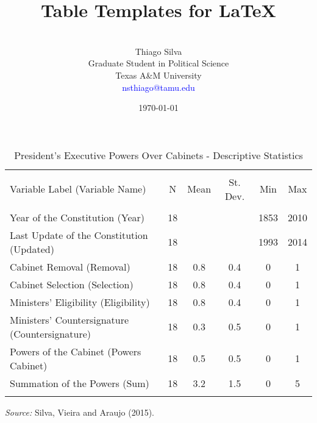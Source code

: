 \documentclass[12pt,a4paper]{article}
\title{	
\Large{Table Templates for \LaTeX} \\   %
}
\author{\\ Thiago Silva \\ \large  Graduate Student in Political Science \\ \large Texas A\&M University \\ \large \textcolor{blue}{nsthiago@tamu.edu}}%
\date{\today} %
\begin{document}
\maketitle %


\begin{table}[htbp] \centering 
  \caption{President's Executive Powers Over Cabinets - Descriptive Statistics  \label{PrePower} } 
\begin{tabular}{@{\extracolsep{5pt}}lccccc} 
\\[-1.8ex]\hline 
\hline \\[-1.8ex] 
Variable Label (Variable Name) & \multicolumn{1}{c}{N} & \multicolumn{1}{c}{Mean} & \multicolumn{1}{c}{St. Dev.} & \multicolumn{1}{c}{Min} & \multicolumn{1}{c}{Max} \\ 
\hline \\[-1.8ex] 
Year of the Constitution (Year) & 18 & &  & 1853 & 2010 \\ 
Last Update of the Constitution (Updated) & 18 &  &  & 1993 & 2014 \\ 
Cabinet Removal (Removal) & 18 & 0.8 & 0.4 & 0 & 1 \\ 
Cabinet Selection (Selection) & 18 & 0.8 & 0.4 & 0 & 1 \\ 
Ministers' Eligibility (Eligibility) & 18 & 0.8 & 0.4 & 0 & 1 \\ 
Ministers' Countersignature (Countersignature) & 18 & 0.3 & 0.5 & 0 & 1 \\ 
Powers of the Cabinet (Powers Cabinet) & 18 & 0.5 & 0.5 & 0 & 1 \\ 
Summation of the Powers (Sum) & 18 & 3.2 & 1.5 & 0 & 5 \\ 
\hline \\[-1.8ex] 
\end{tabular} 
\raggedright\scriptsize\emph{Source:} {Silva, Vieira and Araujo (2015).}
\end{table}

\end{document}
